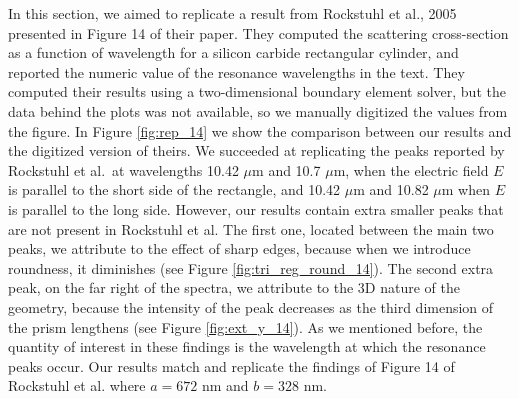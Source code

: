 In this section, we aimed to replicate a result from Rockstuhl et al., 2005 \cite{rockstuhl2005} presented in Figure 14 of their paper. 
They computed the scattering cross-section as a function of wavelength for a silicon carbide rectangular cylinder, and reported the
numeric value of the resonance wavelengths in the text. They computed their results using a two-dimensional boundary element solver, 
but the data behind the plots was not available, so we manually digitized the values from the figure. In Figure \ref{fig:rep_14} we 
show the comparison between our results and the digitized version of theirs. We succeeded at replicating the peaks reported by 
Rockstuhl et al.\ at wavelengths 10.42 $\mu$m and 10.7 $\mu$m,  when the electric field $E$ is parallel to the short side of 
the rectangle, and 10.42 $\mu$m and 10.82 $\mu$m when $E$ is parallel to the long side. However, our results contain extra smaller peaks 
that are not present in Rockstuhl et al. The first one, located between the main two peaks, we attribute to the effect of sharp edges, 
because when we introduce roundness, it diminishes (see Figure \ref{fig:tri_reg_round_14}). The second extra peak, on the far right of the spectra, 
we attribute to the 3D nature of the geometry, because the intensity of the peak decreases as the third dimension of the prism lengthens
(see Figure \ref{fig:ext_y_14}). As we mentioned before, the quantity of interest in these findings is the wavelength at which the resonance peaks
occur. Our results match and replicate the findings of Figure 14 of Rockstuhl et al. where $a = 672$ nm and $b = 328$ nm.
